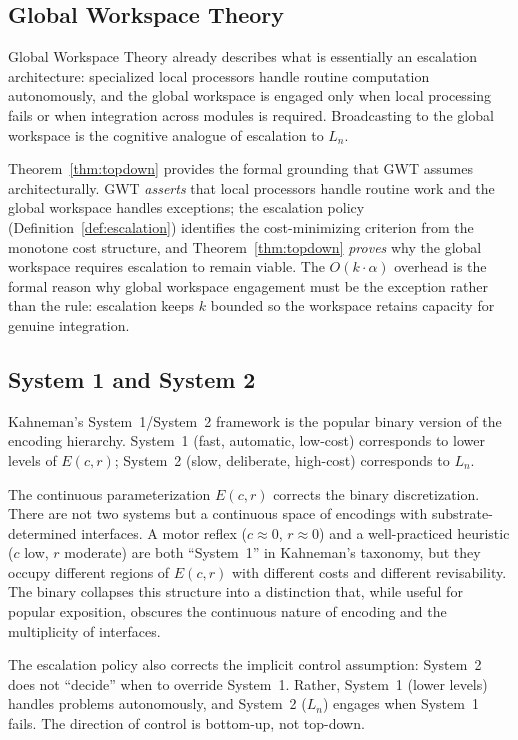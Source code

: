 \documentclass[11pt]{article}
\theoremstyle{definition}
\begin{document}
\subsection{Global Workspace Theory}

Global Workspace Theory \cite{Baars1988,Dehaene2011} already
describes what is essentially an escalation architecture: specialized
local processors handle routine computation autonomously, and the
global workspace is engaged only when local processing fails or when
integration across modules is required. Broadcasting to the global
workspace is the cognitive analogue of escalation to $L_n$.

Theorem~\ref{thm:topdown} provides the formal grounding that GWT
assumes architecturally. GWT \emph{asserts} that local processors
handle routine work and the global workspace handles exceptions;
the escalation policy (Definition~\ref{def:escalation}) identifies the
cost-minimizing criterion from the monotone cost structure, and
Theorem~\ref{thm:topdown}
\emph{proves} why the global workspace requires escalation to remain
viable. The $O(k \cdot \alpha)$ overhead is the formal
reason why global workspace engagement must be the exception rather
than the rule: escalation keeps $k$ bounded so the workspace retains
capacity for genuine integration.

\subsection{System 1 and System 2}

Kahneman's System~1/System~2 framework \cite{Kahneman2011} is the
popular binary version of the encoding hierarchy. System~1 (fast,
automatic, low-cost) corresponds to lower levels of $E(c,r)$;
System~2 (slow, deliberate, high-cost) corresponds to $L_n$.

The continuous parameterization $E(c,r)$ corrects the binary
discretization. There are not two systems but a continuous space of
encodings with substrate-determined interfaces. A motor reflex
($c \approx 0$, $r \approx 0$) and a well-practiced heuristic
($c$ low, $r$ moderate) are both ``System~1'' in Kahneman's
taxonomy, but they occupy different regions of $E(c,r)$ with different
costs and different revisability. The binary collapses this structure
into a distinction that, while useful for popular exposition, obscures
the continuous nature of encoding and the multiplicity of interfaces.

The escalation policy also corrects the implicit control
assumption: System~2 does not ``decide'' when to override System~1.
Rather, System~1 (lower levels) handles problems autonomously, and
System~2 ($L_n$) engages when System~1 fails. The direction of
control is bottom-up, not top-down.
\end{document}
